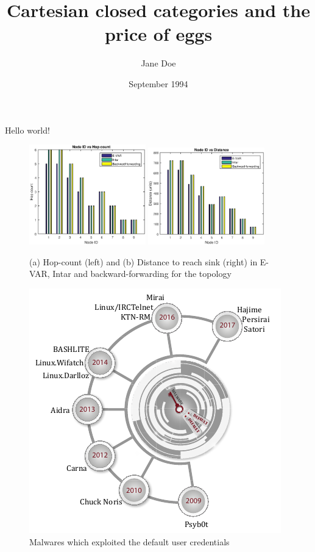 \documentclass{article}
\title{Cartesian closed categories and the price of eggs}
\author{Jane Doe}
\date{September 1994}
\begin{document}
   \maketitle
   Hello world!
   
\begin{figure}[h!]
    \centering
    \includegraphics[width=0.45\textwidth]{graph_Backtracking.eps}
    \includegraphics[width=0.45\textwidth]{graph_backtrack_distance.eps}
    \caption{(a) Hop-count (left) and (b) Distance to reach sink (right) in E-VAR, Intar and backward-forwarding for the topology}
    \label{fevar3}
\end{figure}

\begin{figure}[H]
    \centering
    \includegraphics[scale = 0.5]{fig1.png}
    \caption{Malwares which exploited the default user credentials}
    \label{fig1}
\end{figure}
\end{document}
